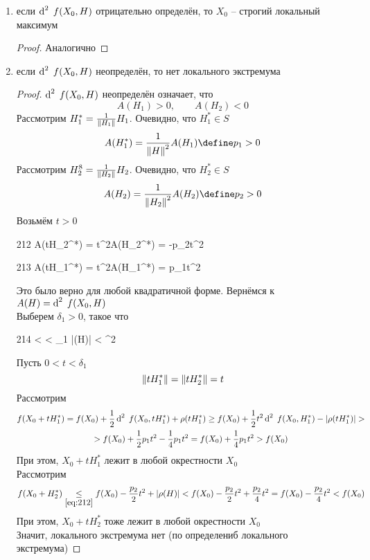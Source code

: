 \begin{theorem}
\begin{enumerate}
\begin{proof}
\begin{multline*}
			\end{multline*}
		\end{proof}
		\item\label{th:5} если $ \di[2] f(X_0, H) $ отрицательно определён, то $ X_0 $ -- строгий локальный максимум
		\begin{proof}
			Аналогично
		\end{proof}
		\item\label{th:6} если $ \di[2] f(X_0, H) $ неопределён, то нет локального экстремума
		\begin{proof}
			$ \di[2] f(X_0, H) $ неопределён означает, что
			$$ A(H_1) > 0, \qquad A(H_2) < 0 $$
			Рассмотрим $ H_1^* = \frac1{\left\|{H_1}\right\|}H_1 $. Очевидно, что $ H_1^* \in S $
			$$ A(H_1^*) = \frac1{\norm{H}^2}A(H_1) \define p_1 > 0 $$
			Рассмотрим $ H_2^8 = \frac1{\left\|{H_2}\right\|}H_2 $. Очевидно, что $ H_2^* \in S $
			$$ A(H_2) = \frac1{\norm{H_2}^2}A(H_2) \define p_2 > 0 $$
			Возьмём $ t > 0 $
			\begin{equ}{212}
				A(tH_2^*) = t^2A(H_2^*) = -p_2t^2
			\end{equ}
			\begin{equ}{213}
				A(tH_1^*) = t^2A(H_1^*) = p_1t^2
			\end{equ}
			Это было верно для любой квадратичной форме. Вернёмся к $ A(H) = \di[2] f(X_0, H) $ \\
			Выберем $ \delta_1 > 0 $, такое что
			\begin{equ}{214}
				 <  < \delta_1 \quad |\rho(H)| <  \min{} \cdot {}^2
			\end{equ}
			Пусть $ 0 < t < \delta_1 $
			$$ \left\|{tH_1^*}\right\| = \left\|{tH_2^*}\right\| = t $$
			Рассмотрим
			\begin{multline*}
				f(X_0 + tH_1^*) = f(X_0) + \half \di[2] f(X_0, tH_1^*) + \rho(tH_1^*) \ge f(X_0) + \half t^2 \di[2] f(X_0, H_1^*) - |\rho(tH_1^*)| > \\
				> f(X_0) + \half p_1t^2 - \frac14 p_1t^2 = f(X_0) + \frac14 p_1t^2 > f(X_0)
			\end{multline*}
			При этом, $ X_0 + tH_1^* $ лежит в любой окрестности $ X_0 $ \\
			Рассмотрим
			$$ f(X_0 + H_2^*) \underset{\eref{212}}\le f(X_0) - \half[p_2]t^2 + |\rho(H)| < f(X_0) - \half[p_2]t^2 + \frac{p_2}4t^2 = f(X_0) - \frac{p_2}4t^2 < f(X_0) $$
			При этом, $ X_0 + tH_2^* $ тоже лежит в любой окрестности $ X_0 $ \\
			Значит, локального экстремума нет (по определениб локального экстремума)
		\end{proof}
	\end{enumerate}
\end{theorem}
